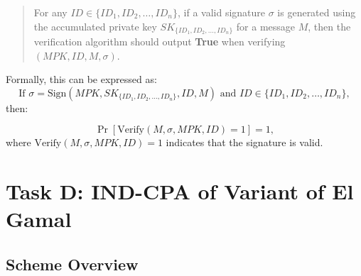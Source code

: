 \documentclass[12pt]{article}
\begin{document}
\begin{quote}
For any \( ID \in \{ID_1, ID_2, \dots, ID_n\} \), if a valid signature \( \sigma \) is generated using the accumulated private key \( SK_{\{ID_1, ID_2, \dots, ID_n\}} \) for a message \( M \), then the verification algorithm should output \textbf{True} when verifying \( (MPK, ID, M, \sigma) \).
\end{quote}

Formally, this can be expressed as:
\[
\text{If } \sigma = \text{Sign}(MPK, SK_{\{ID_1, ID_2, \dots, ID_n\}}, ID, M) \text{ and } ID \in \{ID_1, ID_2, \dots, ID_n\},
\]
then:

\[
\Pr[\text{Verify}(M, \sigma, MPK, ID) = 1] = 1,
\]
where \(\text{Verify}(M, \sigma, MPK, ID) = 1\) indicates that the signature is valid.

\section{Task D: IND-CPA of Variant of El Gamal}







\subsection{Scheme Overview}
\end{document}
